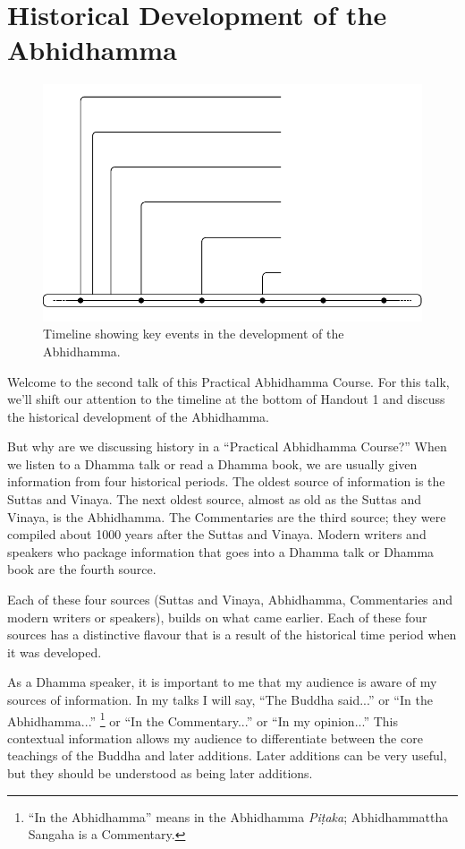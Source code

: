 \section{Historical Development of the Abhidhamma}

\begin{figure}[h]
\centering
\includegraphics[width=1\linewidth]{./Diagrams/Timeline}
\caption{Timeline showing key events in the development of the Abhidhamma.}
\label{fig:Timeline}
\end{figure}

Welcome to the second talk of this Practical Abhidhamma Course. For this talk, we’ll shift our attention to the timeline at the bottom of Handout 1 and discuss the historical development of the Abhidhamma. 

But why are we discussing history in a “Practical Abhidhamma Course?” When we listen to a Dhamma talk or read a Dhamma book, we are usually given information from four historical periods. The oldest source of information is the Suttas and Vinaya. The next oldest source, almost as old as the Suttas and Vinaya, is the Abhidhamma. The Commentaries are the third source; they were compiled about 1000 years after the Suttas and Vinaya. Modern writers and speakers who package information that goes into a Dhamma talk or Dhamma book are the fourth source.

Each of these four sources (Suttas and Vinaya, Abhidhamma, Commentaries and modern writers or speakers), builds on what came earlier. Each of these four sources has a distinctive flavour that is a result of the historical time period when it was developed. 

As a Dhamma speaker, it is important to me that my audience is aware of my sources of information. In my talks I will say, “The Buddha said...” or “In the Abhidhamma...” \footnote{“In the Abhidhamma” means in the Abhidhamma \textit{Piṭaka}; Abhidhammattha Sangaha is a Commentary.} or “In the Commentary...” or “In my opinion...” This contextual information allows my audience to differentiate between the core teachings of the Buddha and later additions. Later additions can be very useful, but they should be understood as being later additions.

